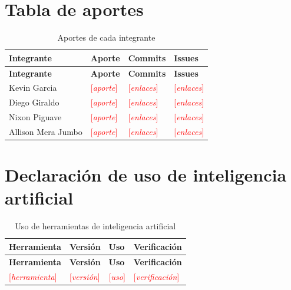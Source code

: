 \documentclass[11pt,a4paper]{article}
\newcommand{\pendiente}[1]{\textcolor{red}{[\textit{#1}]}}
\begin{document}
\section{Tabla de aportes}
\begin{xltabular}{\textwidth}{L{3.3cm}XL{2.5cm}L{2.5cm}}
  \caption{Aportes de cada integrante}\label{tab:aportes}\\
  \toprule
  \textbf{Integrante} & \textbf{Aporte} & \textbf{Commits} & \textbf{Issues} \\
  \midrule
  \endfirsthead
  \toprule
  \textbf{Integrante} & \textbf{Aporte} & \textbf{Commits} & \textbf{Issues} \\
  \midrule
  \endhead
  \bottomrule
  \endfoot
  Kevin Garcia       & \pendiente{aporte} & \pendiente{enlaces} & \pendiente{enlaces} \\
    Diego Giraldo      & \pendiente{aporte} & \pendiente{enlaces} & \pendiente{enlaces} \\
    Nixon Piguave      & \pendiente{aporte} & \pendiente{enlaces} & \pendiente{enlaces} \\
    Allison Mera Jumbo & \pendiente{aporte} & \pendiente{enlaces} & \pendiente{enlaces} \\
\end{xltabular}

\section{Declaración de uso de inteligencia artificial}
\begin{xltabular}{\textwidth}{L{2.5cm}L{2cm}XX}
  \caption{Uso de herramientas de inteligencia artificial}\label{tab:ia}\\
  \toprule
  \textbf{Herramienta} & \textbf{Versión} & \textbf{Uso} & \textbf{Verificación} \\
  \midrule
  \endfirsthead
  \toprule
  \textbf{Herramienta} & \textbf{Versión} & \textbf{Uso} & \textbf{Verificación} \\
  \midrule
  \endhead
  \bottomrule
  \endfoot
  \pendiente{herramienta} & \pendiente{versión} & \pendiente{uso} & \pendiente{verificación} \\
\end{xltabular}

\printbibliography[heading=bibintoc,title={Referencias}]
\end{document}
